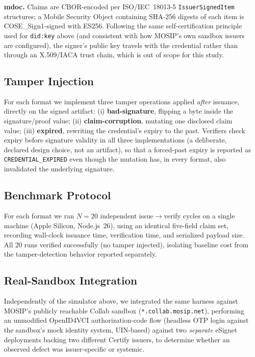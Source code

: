 \documentclass[conference]{IEEEtran}
\begin{document}
\textbf{mdoc.} Claims are CBOR-encoded per ISO/IEC~18013-5 \texttt{IssuerSignedItem} structures; a Mobile Security Object containing SHA-256 digests of each item is COSE\_Sign1-signed with ES256. Following the same self-certification principle used for \texttt{did:key} above (and consistent with how MOSIP's own sandbox issuers are configured), the signer's public key travels with the credential rather than through an X.509/IACA trust chain, which is out of scope for this study.

\subsection{Tamper Injection}
For each format we implement three tamper operations applied \emph{after} issuance, directly on the signed artifact: (i) \textbf{bad-signature}, flipping a byte inside the signature/proof value; (ii) \textbf{claim-corruption}, mutating one disclosed claim value; (iii) \textbf{expired}, rewriting the credential's expiry to the past. Verifiers check expiry before signature validity in all three implementations (a deliberate, declared design choice, not an artifact), so that a forced-past expiry is reported as \texttt{CREDENTIAL\_EXPIRED} even though the mutation has, in every format, also invalidated the underlying signature.

\subsection{Benchmark Protocol}
\label{sec:benchmark-protocol}
For each format we ran $N=20$ independent issue$\to$verify cycles on a single machine (Apple Silicon, Node.js~26), using an identical five-field claim set, recording wall-clock issuance time, verification time, and serialized payload size. All 20 runs verified successfully (no tamper injected), isolating baseline cost from the tamper-detection behavior reported separately.

\subsection{Real-Sandbox Integration}
Independently of the simulator above, we integrated the same harness against MOSIP's publicly reachable Collab sandbox (\texttt{*.collab.mosip.net}), performing an unmodified OpenID4VCI authorization-code flow (headless OTP login against the sandbox's mock identity system, UIN-based) against two \emph{separate} eSignet deployments backing two different Certify issuers, to determine whether an observed defect was issuer-specific or systemic.
\end{document}
